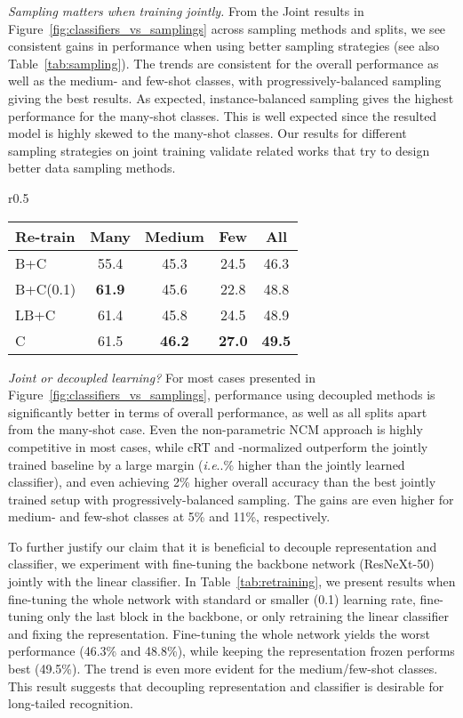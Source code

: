 \documentclass[dvipsnames]{article} \usepackage{iclr2020_conference, times}
\makeatletter
\DeclareRobustCommand\onedot{\futurelet\@let@token\@onedot}
\def\@onedot{\ifx\@let@token.\else.\null\fi\xspace}
\def\ie{\emph{i.e}\onedot} \def\Ie{\emph{I.e}\onedot}
\newcommand{\uniform}{instance-balanced\xspace}
\newcommand{\shift}{progressively-balanced\xspace}
\newcommand{\ncm}{NCM\xspace}
\newcommand{\retrain}{cRT\xspace}
\newcommand{\wnorm}{-normalized\xspace}
\makeatother
\begin{document}
\emph{Sampling matters when training jointly.} From the Joint results in Figure~\ref{fig:classifiers_vs_samplings} across sampling methods and splits, we see consistent gains in performance when using better sampling strategies (see also Table~\ref{tab:sampling}). The trends are consistent for the overall performance as well as the medium- and few-shot classes, with \shift sampling giving the best results. As expected, \uniform sampling gives the highest performance for the many-shot classes. This is well expected since the resulted model is highly skewed to the  many-shot classes. Our results for different sampling strategies on joint training validate related works that try to design better data sampling methods.


\begin{wraptable}{r}{0.5\linewidth}
\small
\caption{Retraining/finetuning different parts of a ResNeXt-50 model on ImageNet-LT. B: backbone; C: classifier; LB: last block.}
\label{tab:retraining}
\begin{center}
\begin{tabular}{lcccc}
\toprule
Re-train & Many & Medium & Few & All \\
\midrule
B+C & 55.4 & 45.3 & 24.5 & 46.3 \\
B+C(0.1) & \textbf{61.9} & 45.6 & 22.8 & 48.8 \\
LB+C & 61.4 & 45.8 & 24.5 & 48.9 \\
C & 61.5 & \textbf{46.2} &	\textbf{27.0} &	\textbf{49.5} \\
\bottomrule
\end{tabular}
\end{center}
\end{wraptable}


\emph{Joint or decoupled learning?} For most cases presented in Figure~\ref{fig:classifiers_vs_samplings}, performance using decoupled methods is significantly better in terms of overall performance, as well as all splits apart from the many-shot case. Even the non-parametric \ncm approach is highly competitive in most cases, while \retrain and \wnorm outperform the jointly trained baseline by a large margin (\ie 5\% higher than the jointly learned classifier), and even achieving 2\% higher overall accuracy than the best jointly trained setup with \shift sampling. The gains are even higher for medium- and few-shot classes at 5\% and 11\%, respectively.

To further justify our claim that it is beneficial to decouple representation and classifier, we experiment with fine-tuning the backbone network (ResNeXt-50) jointly with the linear classifier. In Table~\ref{tab:retraining}, we present results when fine-tuning the whole network with standard or smaller (0.1) learning rate, fine-tuning only the last block in the backbone, or only retraining the linear classifier and fixing the representation. Fine-tuning the whole network yields the worst performance (46.3\% and 48.8\%), while keeping the representation frozen performs best (49.5\%). The trend is even more evident for the medium/few-shot classes. This result suggests that decoupling representation and classifier is desirable for long-tailed recognition.
 
\end{document}
